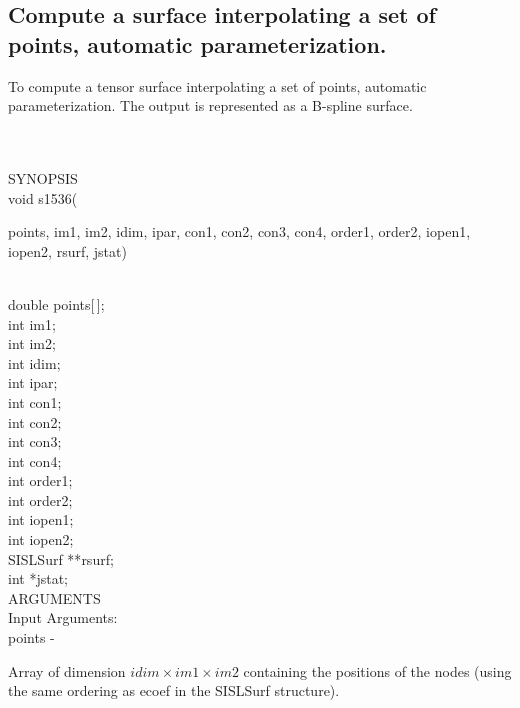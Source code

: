 \subsection{Compute a surface interpolating a set of points,
automatic parameterization.}
\begin{minipg1}
  To compute a tensor surface interpolating a set of points,
  automatic parameterization.
  The output is represented as a B-spline surface.
\end{minipg1}\\ \\
SYNOPSIS\\
        \>void s1536(\begin{minipg3}
          {\fov points}, {\fov im1}, {\fov im2}, {\fov idim}, {\fov ipar}, {\fov con1}, {\fov con2}, {\fov con3},
          {\fov con4}, {\fov order1},  {\fov order2},  {\fov iopen1}, {\fov iopen2}, {\fov rsurf}, {\fov jstat})
        \end{minipg3}\\[0.3ex]
        \>\>    double \> {\fov points}[\,];\\
        \>\>    int \> {\fov im1};\\
        \>\>    int \> {\fov im2};\\
        \>\>    int \> {\fov idim};\\
        \>\>    int \> {\fov ipar};\\
        \>\>    int \> {\fov con1};\\
        \>\>    int \> {\fov con2};\\
        \>\>    int \> {\fov con3};\\
        \>\>    int \> {\fov con4};\\
        \>\>    int \> {\fov order1};\\
        \>\>    int \> {\fov order2};\\
        \>\>    int \> {\fov iopen1};\\
        \>\>    int \> {\fov iopen2};\\
        \>\>    SISLSurf \> **{\fov rsurf};\\
        \>\>    int \> *{\fov jstat};\\
\newpagetabs
ARGUMENTS\\
        \>Input Arguments:\\
        \>\>    {\fov points}\> - \>
        \begin{minipg2}
          Array of dimension $idim\times im1\times im2$ containing
          the positions of the nodes (using the same ordering
          as ecoef in the SISLSurf structure).
        \end{minipg2}\\[0.8ex]
